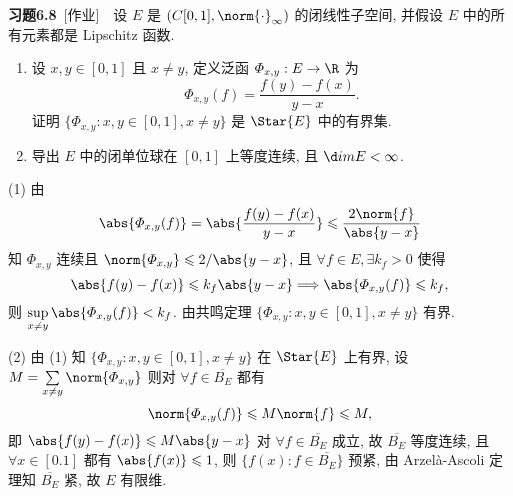 	\textbf{习题6.8}\ [作业]\ \ 设 $ E $ 是 $ (C[0, 1], \norm{\cdot}_{\infty}) $ 的闭线性子空间, 并假设 $ E $ 中的所有元素都是 Lipschitz 函数.
	\begin{enumerate}
		\item 设 $ x, y\in[0, 1] $ 且 $ x\ne y $, 定义泛函 $ \varPhi_{x, y}:E\to\R $ 为
		\[
			\varPhi_{x, y}(f)=\frac{f(y)-f(x)}{y-x}.
		\]
		证明 $\{ \varPhi_{x, y}:x, y\in[0, 1], x\ne y \}$ 是 $ \Star{E} $ 中的有界集.
		\item 导出 $ E $ 中的闭单位球在 $ [0, 1] $ 上等度连续, 且 $ \d im E<\infty $.
	\end{enumerate}
	\begin{answer}
		(1) 由
		\[
			\abs{\varPhi_{x, y}(f)}=\abs{\frac{f(y)-f(x)}{y-x}}\leqslant\frac{2\norm{f}}{\abs{y-x}}
		\]
		知 $ \varPhi_{x, y} $ 连续且 $ \norm{\varPhi_{x, y}}\leqslant2/\abs{y-x} $, 且 $ \forall f\in E, \exists k_{f}>0 $ 使得
		\[
			\abs{f(y)-f(x)}\leqslant k_{f}\abs{y-x}\Longrightarrow \abs{\varPhi_{x, y}(f)}\leqslant k_{f},
		\]
		则 $\sup\limits_{x\ne y}\abs{\varPhi_{x, y}(f)}<k_{f} $. 由共鸣定理 $\{ \varPhi_{x, y}:x, y\in[0, 1], x\ne y \}$ 有界.

		(2) 由 (1) 知 $\{ \varPhi_{x, y}:x, y\in[0, 1], x\ne y \}$ 在 $ \Star{E} $ 上有界, 设 $ M=\sum\limits_{x\ne y}\norm{\varPhi_{x, y}} $ 则对 $ \forall f\in\overline{B_{E}} $ 都有
		\[
			\norm{\varPhi_{x, y}(f)}\leqslant M\norm{f}\leqslant M,
		\]
		即 $ \abs{f(y)-f(x)}\leqslant M\abs{y-x} $ 对 $ \forall f\in\overline{B_{E}} $ 成立, 故 $ \overline{B_{E}} $ 等度连续, 且 $ \forall x\in[0. 1] $ 都有 $ \abs{f(x)}\leqslant 1 $, 则 $ \{ f(x):f\in\overline{B_{E}} \} $ 预紧, 由 Arzel\`a-Ascoli 定理知 $ \overline{B_{E}} $ 紧, 故 $ E $ 有限维.\qedhere
	\end{answer}

